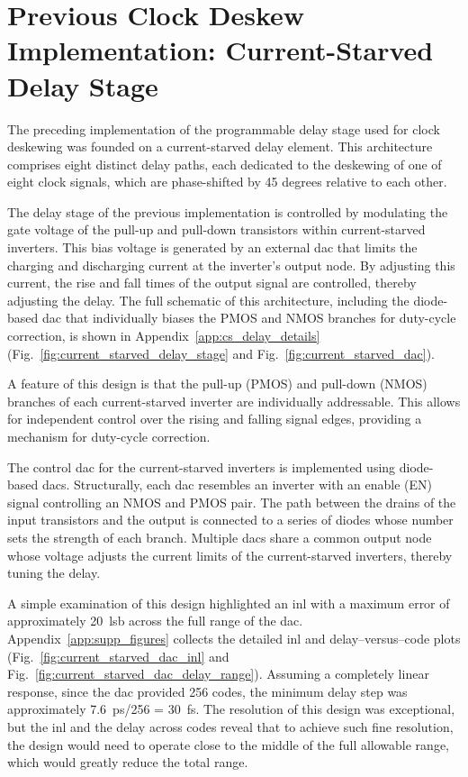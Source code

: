 
\section{Previous Clock Deskew Implementation: Current-Starved Delay Stage}

The preceding implementation of the programmable delay stage used for clock deskewing was founded on a current-starved delay element. This architecture comprises eight distinct delay paths, each dedicated to the deskewing of one of eight clock signals, which are phase-shifted by 45 degrees relative to each other.


The delay stage of the previous implementation is controlled by modulating the gate voltage of the pull-up and pull-down transistors within current-starved inverters. This bias voltage is generated by an external \gls{dac} that limits the charging and discharging current at the inverter's output node. By adjusting this current, the rise and fall times of the output signal are controlled, thereby adjusting the delay. The full schematic of this architecture, including the diode-based \gls{dac} that individually biases the PMOS and NMOS branches for duty-cycle correction, is shown in Appendix~\ref{app:cs_delay_details} (Fig.~\ref{fig:current_starved_delay_stage} and Fig.~\ref{fig:current_starved_dac}).

A feature of this design is that the pull-up (PMOS) and pull-down (NMOS) branches of each current-starved inverter are individually addressable. This allows for independent control over the rising and falling signal edges, providing a mechanism for duty-cycle correction.

The control \gls{dac} for the current-starved inverters is implemented using diode-based \gls{dac}s. Structurally, each \gls{dac} resembles an inverter with an enable (EN) signal controlling an NMOS and PMOS pair. The path between the drains of the input transistors and the output is connected to a series of diodes whose number sets the strength of each branch. Multiple \gls{dac}s share a common output node whose voltage adjusts the current limits of the current-starved inverters, thereby tuning the delay.



A simple examination of this design highlighted an \gls{inl} with a maximum error of approximately 20~\gls{lsb} across the full range of the \gls{dac}. Appendix~\ref{app:supp_figures} collects the detailed \gls{inl} and delay--versus--code plots (Fig.~\ref{fig:current_starved_dac_inl} and Fig.~\ref{fig:current_starved_dac_delay_range}). Assuming a completely linear response, since the \gls{dac} provided 256 codes, the minimum delay step was approximately 7.6~ps/256 = 30~fs. The resolution of this design was exceptional, but the \gls{inl} and the delay across codes reveal that to achieve such fine resolution, the design would need to operate close to the middle of the full allowable range, which would greatly reduce the total range.



